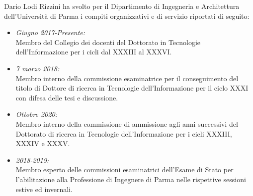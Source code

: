 \documentclass[11pt]{article}
\newcommand{\ITEMDATE}[1]{\item \textit{#1:}\\}
\begin{document}
Dario Lodi Rizzini ha svolto per il Dipartimento di Ingegneria e Architettura dell'Universit\`a di Parma i compiti organizzativi e di servizio riportati di seguito:
\begin{itemize}

\ITEMDATE{Giugno 2017-Presente} 
Membro del Collegio dei docenti del Dottorato in Tecnologie dell'Informazione per i cicli dal XXXIII al XXXVI.

\ITEMDATE{7 marzo 2018} 
Membro interno della commissione esaminatrice per il conseguimento del titolo di Dottore di ricerca in Tecnologie dell'Informazione per il ciclo XXXI con difesa delle tesi e discussione.

\ITEMDATE{Ottobre 2020} 
Membro interno della commissione di ammissione agli anni successivi del Dottorato di ricerca in Tecnologie dell'Informazione per i cicli XXXIII, XXXIV e XXXV.

\ITEMDATE{2018-2019} 
Membro esperto delle commissioni esaminatrici dell'Esame di Stato per l'abilitazione alla Professione di Ingegnere di Parma nelle rispettive sessioni estive ed invernali. 

\end{itemize}



\end{document}
